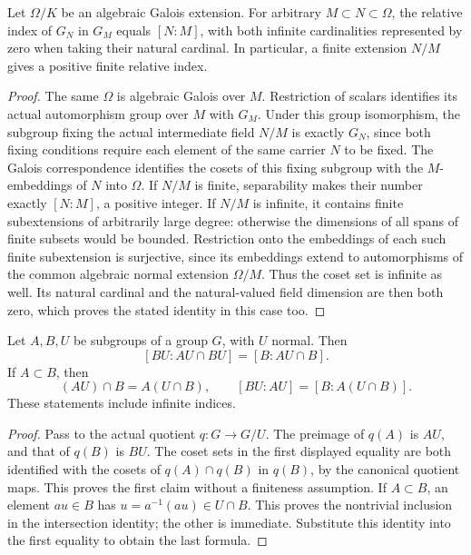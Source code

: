 \begin{lemma}
\label{fw:finite-extension-fixing-index}
\leanok
Let $\Omega/K$ be an algebraic Galois extension. For arbitrary
$M\subset N\subset\Omega$, the relative index
of $G_N$ in $G_M$ equals $[N:M]$, with both infinite cardinalities
represented by zero when taking their natural cardinal. In particular,
a finite extension $N/M$ gives a positive finite relative index.
\end{lemma}
\begin{proof}
The same $\Omega$ is algebraic Galois over $M$.
Restriction of scalars identifies its actual automorphism group over
$M$ with $G_M$. Under this group isomorphism, the subgroup fixing the
actual intermediate field $N/M$ is exactly $G_N$, since both fixing
conditions require each element of the same carrier $N$ to be fixed.
The Galois correspondence identifies the cosets of this fixing subgroup
with the $M$-embeddings of $N$ into $\Omega$. If $N/M$ is finite,
separability makes their number exactly $[N:M]$, a positive integer.
If $N/M$ is infinite, it contains finite subextensions of arbitrarily
large degree: otherwise the dimensions of all spans of finite subsets
would be bounded. Restriction onto the embeddings of each such finite
subextension is surjective, since its embeddings extend to automorphisms of the common
algebraic normal extension $\Omega/M$. Thus the coset set is infinite as well.
Its natural cardinal and the natural-valued field dimension are then
both zero, which proves the stated identity in this case too.
\end{proof}

\begin{lemma}
\label{fw:normal-product-relative-index}
\leanok
Let $A,B,U$ be subgroups of a group $G$, with $U$ normal. Then
\[
 [BU:AU\cap BU]=[B:AU\cap B].
\]
If $A\subset B$, then
\[
 (AU)\cap B=A(U\cap B),\qquad
 [BU:AU]=[B:A(U\cap B)].
\]
These statements include infinite indices.
\end{lemma}
\begin{proof}
Pass to the actual quotient $q:G\to G/U$. The preimage of $q(A)$ is
$AU$, and that of $q(B)$ is $BU$. The coset sets in the first displayed
equality are both identified with the cosets of $q(A)\cap q(B)$ in
$q(B)$, by the canonical quotient maps. This proves the first claim
without a finiteness assumption. If $A\subset B$, an element $au\in B$
has $u=a^{-1}(au)\in U\cap B$. This proves the nontrivial inclusion
in the intersection identity; the other is immediate. Substitute this
identity into the first equality to obtain the last formula.
\end{proof}

